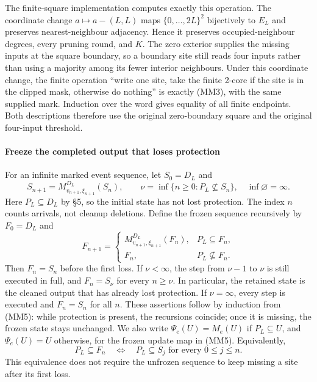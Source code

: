 \documentclass[
  11pt,
  a4paper,
]{article}
\begin{document}
The finite-square implementation computes exactly this operation. The
coordinate change \(a\mapsto a-(L,L)\) maps \(\{0,\ldots,2L\}^2\)
bijectively to \(E_L\) and preserves nearest-neighbour adjacency. Hence
it preserves occupied-neighbour degrees, every pruning round, and \(K\).
The zero exterior supplies the missing inputs at the square boundary, so
a boundary site still reads four inputs rather than using a majority
among its fewer interior neighbours. Under this coordinate change, the
finite operation ``write one site, take the finite 2-core if the site is
in the clipped mask, otherwise do nothing'' is exactly (MM3), with the
same supplied mark. Induction over the word gives equality of all finite
endpoints. Both descriptions therefore use the original zero-boundary
square and the original four-input threshold.

\paragraph{Freeze the completed output that loses
protection}\label{freeze-the-completed-output-that-loses-protection}

For an infinite marked event sequence, let \(S_0=D_L\) and \[
S_{n+1}=M^{D_L}_{v_{n+1},\xi_{n+1}}(S_n),\qquad
\nu=\inf\{n\geq0:P_L\not\subseteq S_n\},
\quad\inf\varnothing=\infty.
\tag{MM4}
\] Here \(P_L\subseteq D_L\) by §5, so the initial state has not lost
protection. The index \(n\) counts arrivals, not cleanup deletions.
Define the frozen sequence recursively by \(F_0=D_L\) and \[
F_{n+1}=
\begin{cases}
M^{D_L}_{v_{n+1},\xi_{n+1}}(F_n),&P_L\subseteq F_n,\\
F_n,&P_L\not\subseteq F_n.
\end{cases}
\tag{MM5}
\] Then \(F_n=S_n\) before the first loss. If \(\nu<\infty\), the step
from \(\nu-1\) to \(\nu\) is still executed in full, and \(F_n=S_\nu\)
for every \(n\geq\nu\). In particular, the retained state is the cleaned
output that has already lost protection. If \(\nu=\infty\), every step
is executed and \(F_n=S_n\) for all \(n\). These assertions follow by
induction from (MM5): while protection is present, the recursions
coincide; once it is missing, the frozen state stays unchanged. We also
write \(\Psi_e(U)=M_e(U)\) if \(P_L\subseteq U\), and \(\Psi_e(U)=U\)
otherwise, for the frozen update map in (MM5). Equivalently, \[
P_L\subseteq F_n
\quad\Longleftrightarrow\quad
P_L\subseteq S_j\text{ for every }0\leq j\leq n.
\tag{MM6}
\] This equivalence does not require the unfrozen sequence to keep
missing a site after its first loss.
\end{document}
